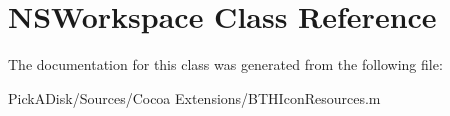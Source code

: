\hypertarget{class_n_s_workspace}{
\section{NSWorkspace Class Reference}
\label{class_n_s_workspace}
}


The documentation for this class was generated from the following file:\begin{DoxyCompactItemize}
\item 
PickADisk/Sources/Cocoa Extensions/BTHIconResources.m\end{DoxyCompactItemize}
